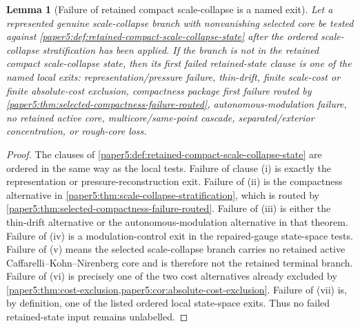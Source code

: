 \documentclass[11pt]{amsart}
\theoremstyle{plain}
\newtheorem{lemma}[lemma]{Lemma}
\theoremstyle{definition}
\theoremstyle{remark}
\begin{document}
\begin{lemma}[Failure of retained compact scale-collapse is a named exit]
\label{paper5:lem:retained-scale-collapse-first-failure}
Let a represented genuine scale-collapse branch with nonvanishing selected core
be tested against
\cref{paper5:def:retained-compact-scale-collapse-state} after the ordered
scale-collapse stratification has been applied.  If the branch is not in the
retained compact scale-collapse state, then its first failed retained-state
clause is one of the named local exits: representation/pressure failure,
thin-drift, finite scale-cost or finite absolute-cost exclusion, compactness
package first failure routed by
\cref{paper5:thm:selected-compactness-failure-routed},
autonomous-modulation failure, no retained active core,
multicore/same-point cascade, separated/exterior concentration, or rough-core
loss.
\end{lemma}

\begin{proof}
The clauses of
\cref{paper5:def:retained-compact-scale-collapse-state} are ordered in the same
way as the local tests.  Failure of clause \textup{(i)} is exactly the
representation or pressure-reconstruction exit.  Failure of
\textup{(ii)} is the compactness alternative in
\cref{paper5:thm:scale-collapse-stratification}, which is routed by
\cref{paper5:thm:selected-compactness-failure-routed}.  Failure of
\textup{(iii)} is either the thin-drift alternative or the
autonomous-modulation alternative in that theorem.  Failure of
\textup{(iv)} is a modulation-control exit in the repaired-gauge state-space
tests.  Failure of \textup{(v)} means the selected scale-collapse branch carries
no retained active Caffarelli--Kohn--Nirenberg core and is therefore not the
retained terminal branch.  Failure of \textup{(vi)} is precisely one of the two
cost alternatives already excluded by
\cref{paper5:thm:cost-exclusion,paper5:cor:absolute-cost-exclusion}.  Failure
of \textup{(vii)} is, by definition, one of the listed ordered local
state-space exits.  Thus no failed retained-state input remains unlabelled.
\end{proof}
\end{document}
